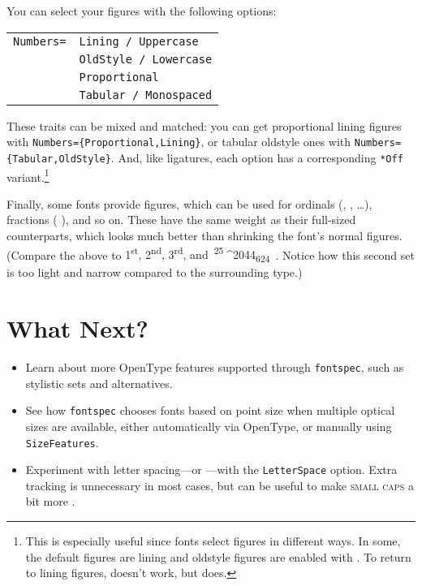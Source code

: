 You can select your figures with the following options:
\begin{leftfigure}
\begin{tabular}{l l}
\texttt{Numbers=} & \texttt{Lining / Uppercase} \\
 & \texttt{OldStyle / Lowercase} \\
 & \texttt{Proportional} \\
 & \texttt{Tabular / Monospaced}
\end{tabular}
\end{leftfigure}
These traits can be mixed and matched:
you can get proportional lining figures
with \texttt{Numbers=\{Proportional,\allowbreak Lining\}},
or tabular oldstyle ones with \texttt{Numbers=\{Tabular,\allowbreak OldStyle\}}.
And, like ligatures, each option has a corresponding \verb|*Off|
variant.\punckern\footnote{This is especially useful since fonts
select figures in different ways.
In some, the default figures are lining
and oldstyle figures are enabled with
.
To return to lining figures,
doesn't work, but
does.}

Finally, some fonts provide  figures,
which can be used for ordinals
(,  , \ldots),
fractions (\,\,), and so on.
These have the same weight as their full-sized counterparts,
which looks much better than shrinking the font's normal figures.
(Compare the above to
{%
\mbox{1\textsuperscript{st}},
\mbox{2\textsuperscript{nd}},
\mbox{3\textsuperscript{rd}},
and
\,\mbox{\textsuperscript{25}^^^^2044\textsubscript{624}}%
\,}.
Notice how this second set is too light and narrow compared to the surrounding
type.)

\section{What Next?}
\begin{itemize}
\item Learn about more OpenType features supported through \texttt{fontspec},
such as stylistic sets and alternatives.
\item See how \texttt{fontspec} chooses fonts based on point size when multiple
    optical sizes are available, either automatically via OpenType,
    or manually using \texttt{SizeFeatures}.
\item Experiment with letter spacing---or ---with
    the \texttt{LetterSpace} option.
    Extra tracking is unnecessary in most cases,
    but can be useful to make \textsc{small caps}
    a bit more .
\end{itemize}
